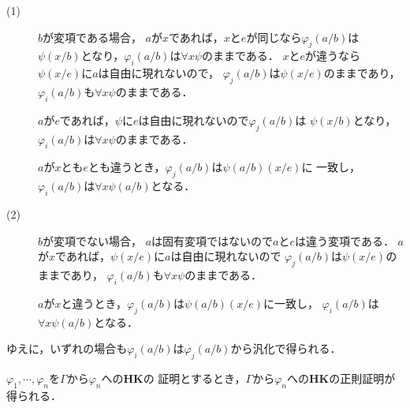 \begin{metaprf}
\begin{description}
				\begin{description}
					\item[(1)] $b$が変項である場合，
						$a$が$x$であれば，$x$と$e$が同じなら$\varphi_{j}(a/b)$は
						$\psi(x/b)$となり，$\varphi_{i}(a/b)$は$\forall x \psi$のままである．
						$x$と$e$が違うなら$\psi(x/e)$に$a$は自由に現れないので，
						$\varphi_{j}(a/b)$は$\psi(x/e)$のままであり，
						$\varphi_{i}(a/b)$も$\forall x \psi$のままである．
						
						$a$が$e$であれば，$\psi$に$e$は自由に現れないので$\varphi_{j}(a/b)$は
						$\psi(x/b)$となり，$\varphi_{i}(a/b)$は$\forall x \psi$のままである．
				
						$a$が$x$とも$e$とも違うとき，$\varphi_{j}(a/b)$は$\psi(a/b)(x/e)$に
						一致し，$\varphi_{i}(a/b)$は$\forall x \psi(a/b)$となる．
						
					\item[(2)] $b$が変項でない場合，
						$a$は固有変項ではないので$a$と$e$は違う変項である．
						$a$が$x$であれば，$\psi(x/e)$に$a$は自由に現れないので
						$\varphi_{j}(a/b)$は$\psi(x/e)$のままであり，
						$\varphi_{i}(a/b)$も$\forall x \psi$のままである．
				
						$a$が$x$と違うとき，$\varphi_{j}(a/b)$は$\psi(a/b)(x/e)$に一致し，
						$\varphi_{i}(a/b)$は$\forall x \psi(a/b)$となる．
				\end{description}
				
				ゆえに，いずれの場合も$\varphi_{i}(a/b)$は$\varphi_{j}(a/b)$から汎化で得られる．
				\QED
		\end{description}
	\end{metaprf}
	
	\begin{screen}
		\begin{metathm}[どんな証明も正則化できる]
			$\varphi_{1},\cdots,\varphi_{n}$を$\Gamma$から$\varphi_{n}$への{\bf HK}の
			証明とするとき，$\Gamma$から$\varphi_{n}$への{\bf HK}の正則証明が得られる．
		\end{metathm}
	\end{screen}
	
